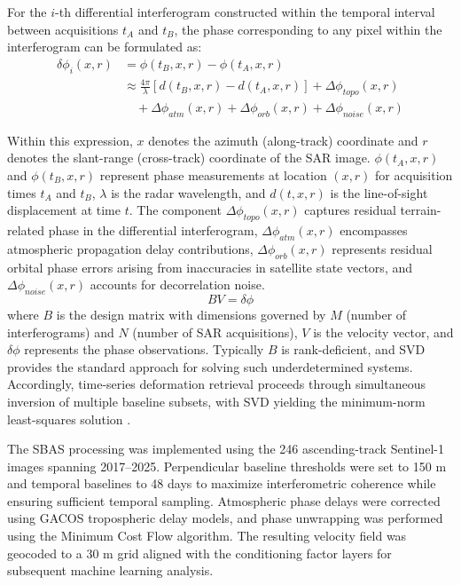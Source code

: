 \documentclass[oneside,doublespacing,flushright]{lsuthesis}
\begin{document}
For the $i$-th differential interferogram constructed within the temporal interval between acquisitions $t_A$ and $t_B$, the phase corresponding to any pixel within the interferogram can be formulated as:
\begin{equation}
\begin{aligned}
\delta\phi_i(x,r) &= \phi(t_B, x, r) - \phi(t_A, x, r) \\
&\approx \frac{4\pi}{\lambda}[d(t_B, x, r) - d(t_A, x, r)] + \Delta\phi_{topo}(x,r) \\
&\quad + \Delta\phi_{atm}(x,r) + \Delta\phi_{orb}(x,r) + \Delta\phi_{noise}(x,r)
\end{aligned}
\end{equation}

Within this expression, $x$ denotes the azimuth (along-track) coordinate and $r$ denotes the slant-range (cross-track) coordinate of the SAR image. $\phi(t_A, x, r)$ and $\phi(t_B, x, r)$ represent phase measurements at location $(x, r)$ for acquisition times $t_A$ and $t_B$, $\lambda$ is the radar wavelength, and $d(t, x, r)$ is the line-of-sight displacement at time $t$. The component $\Delta\phi_{topo}(x,r)$ captures residual terrain-related phase in the differential interferogram, $\Delta\phi_{atm}(x,r)$ encompasses atmospheric propagation delay contributions, $\Delta\phi_{orb}(x,r)$ represents residual orbital phase errors arising from inaccuracies in satellite state vectors, and $\Delta\phi_{noise}(x,r)$ accounts for decorrelation noise.
\begin{equation}
BV = \delta\phi
\end{equation}
where $B$ is the design matrix with dimensions governed by $M$ (number of interferograms) and $N$ (number of SAR acquisitions), $V$ is the velocity vector, and $\delta\phi$ represents the phase observations. Typically $B$ is rank-deficient, and SVD provides the standard approach for solving such underdetermined systems. Accordingly, time-series deformation retrieval proceeds through simultaneous inversion of multiple baseline subsets, with SVD yielding the minimum-norm least-squares solution \citep{Berardino2002}.

The SBAS processing was implemented using the 246 ascending-track Sentinel-1 images spanning 2017--2025. Perpendicular baseline thresholds were set to 150 m and temporal baselines to 48 days to maximize interferometric coherence while ensuring sufficient temporal sampling. Atmospheric phase delays were corrected using GACOS tropospheric delay models, and phase unwrapping was performed using the Minimum Cost Flow algorithm. The resulting velocity field was geocoded to a 30 m grid aligned with the conditioning factor layers for subsequent machine learning analysis.
\end{document}

